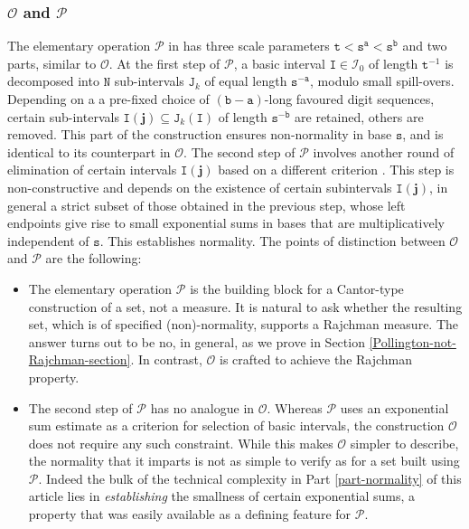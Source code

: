 \documentclass[12pt, twoside]{article}
\theoremstyle{definition}
\numberwithin{equation}{section}
\begin{document}
\subsubsection{$\mathscr{O}$ and $\mathscr{P}$} \label{O-vs-P-section} 
The elementary operation $\mathscr{P}$ in \cite{p81} has three scale parameters $\mathtt t < \mathtt s^{\mathtt a} < \mathtt s^{\mathtt b}$ and two parts, similar to $\mathscr{O}$. At the first step of $\mathscr{P}$, a basic interval $\mathtt I \in \mathscr{I}_0$ of length $\mathtt t^{-1}$ is decomposed into $\mathtt N$ sub-intervals $\mathtt J_k$ of equal length $\mathtt s^{-\mathtt a}$, modulo small spill-overs. Depending on a a pre-fixed choice of $(\mathtt b - \mathtt a)$-long favoured digit sequences, certain sub-intervals $\mathtt I(\mathbf j) \subseteq \mathtt J_k(\mathtt I)$ of length $\mathtt s^{-\mathtt b}$ are retained, others are removed. This part of the construction ensures non-normality in base $\mathtt s$, and is identical to its counterpart in $\mathscr{O}$.  The second step of $\mathscr{P}$ involves another round of elimination of certain intervals $\mathtt I(\mathbf j)$ based on a different criterion \cite[Lemma 3]{p81}. This step is non-constructive and depends on the existence of certain subintervals $\mathtt I(\mathbf j)$, in general a strict subset of those obtained in the previous step, whose left endpoints give rise to small exponential sums in bases that are multiplicatively independent of $\mathtt s$. This establishes normality.     
\vskip0.1in 
\noindent The points of distinction between $\mathscr{O}$ and $\mathscr{P}$ are the following:
\begin{itemize} 
\item The elementary operation $\mathscr{P}$ is the building block for a Cantor-type construction of a set, not a measure. It is natural to ask whether the resulting set, which is of specified (non)-normality, supports a Rajchman measure. The answer turns out to be no, in general, as we prove in Section \ref{Pollington-not-Rajchman-section}. In contrast, $\mathscr{O}$ is crafted to achieve the Rajchman property.  
\vskip0.1in 
\item The second step of $\mathscr{P}$ has no analogue in $\mathscr{O}$. Whereas $\mathscr{P}$ uses an exponential sum estimate as a criterion for selection of basic intervals, the construction $\mathscr{O}$ does not require any such constraint. While this makes $\mathscr{O}$ simpler to describe, the normality that it imparts is not as simple to verify as for a set built using $\mathscr{P}$. Indeed the bulk of the technical complexity in Part \ref{part-normality} of this article lies in {\em{establishing}} the smallness of certain exponential sums, a property that was easily available as a defining feature for $\mathscr{P}$.  
\end{itemize} 
\end{document}
